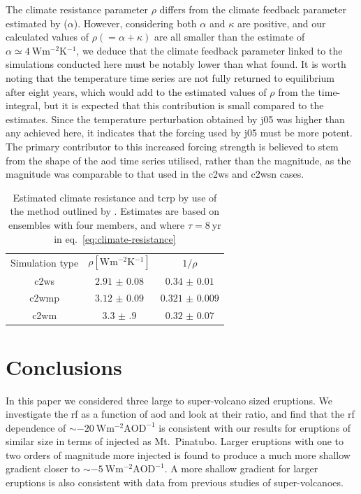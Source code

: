 \documentclass{ametsocV6.1}
\newcommand{\iso}[1][i]{{#1}njected \ce{SO2}}
\begin{document}
The climate resistance parameter \(\rho\) differs from the climate feedback parameter
estimated by \citet{jones2005} (\(\alpha\)). However, considering both \(\alpha \) and
\(\kappa \) are positive, and our calculated values of \(\rho (=\alpha +\kappa) \) are
all smaller than the \citet{jones2005} estimate of \(\alpha \simeq
\SI{4}{\watt\metre^{-2}\kelvin^{-1}}\), we deduce that the climate feedback parameter
linked to the simulations conducted here must be notably lower than what
\citet{jones2005} found. It is worth noting that the temperature time series are not
fully returned to equilibrium after eight years, which would add to the estimated values
of \(\rho \) from the time-integral, but it is expected that this contribution is small
compared to the estimates. Since the temperature perturbation obtained by \gls{j05} was
higher than any achieved here, it indicates that the forcing used by \gls{j05} must be
more potent. The primary contributor to this increased forcing strength is believed to
stem from the shape of the \gls{aod} time series utilised, rather than the magnitude, as
the magnitude was comparable to that used in the \gls{c2ws} and \gls{c2wsn} cases.

\begin{table}
  \centering

  \caption{Estimated climate resistance and \gls{tcrp} by use of the method outlined by
    \citet{merlis2014}. Estimates are based on ensembles with four members, and where \(\tau
    =\SI{8}{\mathrm{yr}}\) in eq.~\ref{eq:climate-resistance}}\label{tab:trcp}%
  \begin{tabular}{ccc}
    Simulation type & \(\rho [\si{\watt\metre^{-2}\kelvin^{-1}}]\) & \(1/\rho\)         \\
    \gls{c2ws}      & \(\num{2.91(8)}\)                            & \(\num{0.34(1)}\)  \\
    \gls{c2wmp}     & \(\num{3.12(9)}\)                            & \(\num{0.321(9)}\) \\
    \gls{c2wm}      & \(\num{3.3(9)}\)                             & \(\num{0.32(7)}\)  \\
  \end{tabular}
\end{table}

\section{Conclusions}\label{sec:conclusions}

In this paper we considered three large to super-volcano sized eruptions. We investigate
the \gls{rf} as a function of \gls{aod} and look at their ratio, and find that the
\gls{rf} dependence of \(\sim\SI{-20}{\watt\metre^{-2}\mathrm{AOD}^{-1}}\) is consistent
with our results for eruptions of similar size in terms of \iso{} as Mt.\ Pinatubo.
Larger eruptions with one to two orders of magnitude more \iso{} is found to produce a
much more shallow gradient closer to \(\sim
\SI{-5}{\watt\metre^{-2}\mathrm{AOD}^{-1}}\). A more shallow gradient for larger
eruptions is also consistent with data from previous studies of super-volcanoes.
\end{document}
